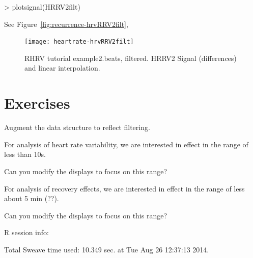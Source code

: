 \documentclass[a4paper, english, utf8]{amsart}
\newcommand{\figref}[1]{Figure\ \vref{#1}}
\newcommand{\R}{{\normalfont\textsf{R}}{}}
\begin{document}
\begin{Schunk}
\begin{Sinput}
> plotsignal(HRRV2filt)
\end{Sinput}
\end{Schunk}
See \figref{fig:recurrence-hrvRRV2filt},

\begin{figure}[htbp]
\begin{center}
\texttt{[image: heartrate-hrvRRV2filt]}
\caption{RHRV tutorial example2.beats, filtered. HRRV2 Signal (differences) and linear interpolation.}
\label{fig:recurrence-hrvRRV2filt}
\end{center}
\end{figure}

\section{Exercises}
\begin{exca}
Augment the data structure to reflect filtering.
\end{exca}

\begin{exca}
For analysis of heart rate variability, we are interested in effect in the range of less than 10s.

Can you modify the displays to focus on this range?
\end{exca}

\begin{exca}
For analysis of recovery effects, we are interested in effect in the range of less about 5 min (??).

Can you modify the displays to focus on this range?
\end{exca}

\clearpage
\nocite{*}
%

%
\clearpage

\printindex

%

\clearpage
\R{} session info:

Total Sweave time used: 10.349 sec. at Tue Aug 26 12:37:13 2014.
\end{document}
